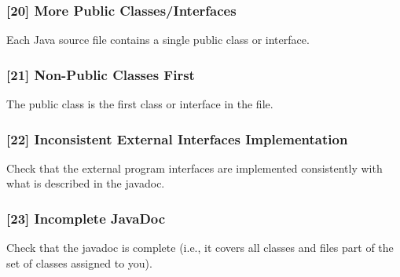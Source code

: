 \subsubsection{[20] More Public Classes/Interfaces}
Each Java source file contains a single public class or interface. 
\subsubsection{[21] Non-Public Classes First}
The public class is the first class or interface in the file.
\subsubsection{[22] Inconsistent External Interfaces Implementation}
Check that the external program interfaces are implemented consistently with what is described in the javadoc.
\subsubsection{[23] Incomplete JavaDoc}
Check that the javadoc is complete (i.e., it covers all classes and files part of the set of classes assigned to you).
